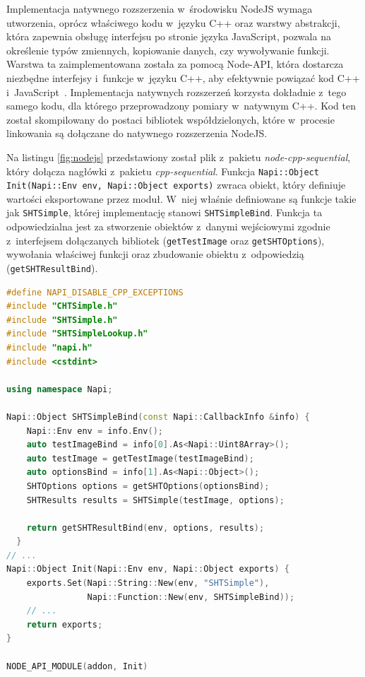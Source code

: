 Implementacja natywnego rozszerzenia w~środowisku NodeJS wymaga utworzenia, oprócz właściwego kodu w~języku C++ oraz warstwy abstrakcji, która zapewnia obsługę interfejsu po stronie języka JavaScript, pozwala na określenie typów zmiennych, kopiowanie danych, czy wywoływanie funkcji. Warstwa ta zaimplementowana została za pomocą Node-API, która dostarcza niezbędne interfejsy i~funkcje w~języku C++, aby efektywnie powiązać kod C++ i~JavaScript~\cite{napi}. Implementacja natywnych rozszerzeń korzysta dokładnie z~tego samego kodu, dla którego przeprowadzony pomiary w~natywnym C++. Kod ten został skompilowany do postaci bibliotek współdzielonych, które w~procesie linkowania są dołączane do natywnego rozszerzenia NodeJS. 

Na listingu \ref{fig:nodejs} przedstawiony został plik z~pakietu \textit{node-cpp-sequential}, który dołącza nagłówki z~pakietu \textit{cpp-sequential}. Funkcja \lstinline{Napi::Object Init(Napi::Env env, Napi::Object exports)} zwraca obiekt, który definiuje wartości eksportowane przez moduł. W~niej właśnie definiowane są funkcje takie jak \lstinline{SHTSimple}, której implementację stanowi \lstinline{SHTSimpleBind}. Funkcja ta odpowiedzialna jest za stworzenie obiektów z~danymi wejściowymi zgodnie z~interfejsem dołączanych bibliotek (\lstinline{getTestImage} oraz \lstinline{getSHTOptions}), wywołania właściwej funkcji oraz zbudowanie obiektu z~odpowiedzią (\lstinline{getSHTResultBind}).

\begin{lstlisting}[language=C++, float=h, caption=Plik powiązania kodu C++ z~JavaScript, label=lst:cpp-js]
#define NAPI_DISABLE_CPP_EXCEPTIONS
#include "CHTSimple.h"
#include "SHTSimple.h"
#include "SHTSimpleLookup.h"
#include "napi.h"
#include <cstdint>

using namespace Napi;
    
Napi::Object SHTSimpleBind(const Napi::CallbackInfo &info) {
    Napi::Env env = info.Env();
    auto testImageBind = info[0].As<Napi::Uint8Array>();
    auto testImage = getTestImage(testImageBind);
    auto optionsBind = info[1].As<Napi::Object>();
    SHTOptions options = getSHTOptions(optionsBind);
    SHTResults results = SHTSimple(testImage, options);
  
    return getSHTResultBind(env, options, results);
  }
// ...
Napi::Object Init(Napi::Env env, Napi::Object exports) {
    exports.Set(Napi::String::New(env, "SHTSimple"),
                Napi::Function::New(env, SHTSimpleBind));
    // ...
    return exports;
}
  
NODE_API_MODULE(addon, Init)
\end{lstlisting}

